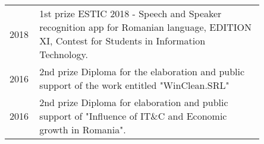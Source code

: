\documentclass[]{deedy-resume-openfont}
\begin{document}
\begin{minipage}[t]{0.59\textwidth}
\begin{tabular}{p{0.05\linewidth}p{0.8\linewidth}}
2018 & 1st prize ESTIC 2018 - Speech
and Speaker recognition app
for Romanian language,
EDITION XI, Contest for Students in
Information Technology. \\

2016 & 2nd prize Diploma for the
elaboration and public
support of the work entitled
"WinClean.SRL" \\

2016 & 2nd prize Diploma for
elaboration and public support of
"Influence of IT\&C and
Economic growth in
Romania".

\end{tabular}
\sectionsep





\end{minipage} 
\end{document}
